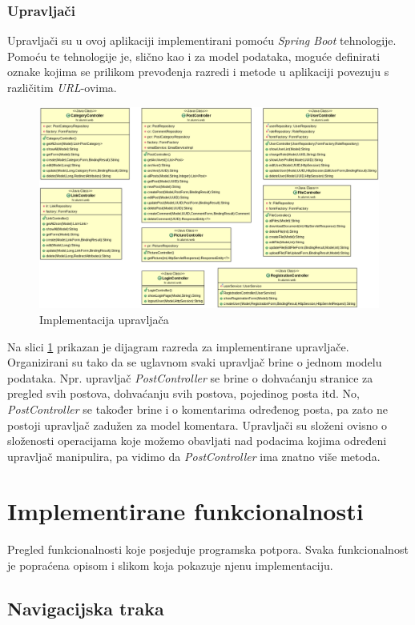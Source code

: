 \documentclass[zavrsni, numeric]{fer}
\begin{document}
\subsection{Upravljači}
Upravljači su u ovoj aplikaciji implementirani pomoću \textit{Spring Boot} tehnologije. Pomoću te tehnologije je, slično kao i za model podataka, moguće definirati oznake kojima se prilikom prevođenja razredi i metode u aplikaciji povezuju s različitim \textit{URL}-ovima.

\begin{figure}[H]
	\centering
	\includegraphics[width=13cm]{slike/kontroleri.png}
	\caption{Implementacija upravljača}
	\label{fig:kontroleri}
\end{figure}

Na slici \ref{fig:kontroleri} prikazan je dijagram razreda za implementirane upravljače. Organizirani su tako da se uglavnom svaki upravljač brine o jednom modelu podataka. Npr. upravljač \textit{PostController} se brine o dohvaćanju stranice za pregled svih postova, dohvaćanju svih postova, pojedinog posta itd. No, \textit{PostController} se također brine i o komentarima određenog posta, pa zato ne postoji upravljač zadužen za model komentara. Upravljači su složeni ovisno o složenosti operacijama koje možemo obavljati nad podacima kojima određeni upravljač manipulira, pa vidimo da \textit{PostController} ima znatno više metoda.

\chapter{Implementirane funkcionalnosti}
Pregled funkcionalnosti koje posjeduje programska potpora. Svaka funkcionalnost je popraćena opisom i slikom koja pokazuje njenu implementaciju.

\section{Navigacijska traka}
\end{document}
